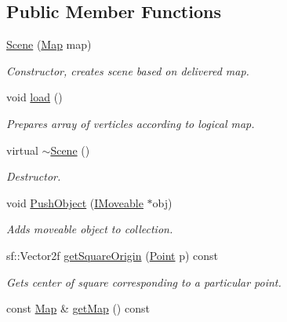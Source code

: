 \subsection*{Public Member Functions}
\begin{DoxyCompactItemize}
\item 
\mbox{\hyperlink{class_scene_a7a4f0004dce8380ca0e31f573a92d7f2}{Scene}} (\mbox{\hyperlink{class_map}{Map}} map)
\begin{DoxyCompactList}\small\item\em Constructor, creates scene based on delivered map. \end{DoxyCompactList}\item 
\mbox{\label{class_scene_ae1b864ad69216f68b5c588477c87ec20}} 
void \mbox{\hyperlink{class_scene_ae1b864ad69216f68b5c588477c87ec20}{load}} ()
\begin{DoxyCompactList}\small\item\em Prepares array of verticles according to logical map. \end{DoxyCompactList}\item 
\mbox{\label{class_scene_a3b8cec2e32546713915f8c6303c951f1}} 
virtual \mbox{\hyperlink{class_scene_a3b8cec2e32546713915f8c6303c951f1}{$\sim$\+Scene}} ()
\begin{DoxyCompactList}\small\item\em Destructor. \end{DoxyCompactList}\item 
void \mbox{\hyperlink{class_scene_a77d8f570a3b13a237b31888429288946}{Push\+Object}} (\mbox{\hyperlink{class_i_moveable}{I\+Moveable}} $\ast$obj)
\begin{DoxyCompactList}\small\item\em Adds moveable object to collection. \end{DoxyCompactList}\item 
sf\+::\+Vector2f \mbox{\hyperlink{class_scene_a527feb6bbb5f751494fac5a3503657e7}{get\+Square\+Origin}} (\mbox{\hyperlink{class_point}{Point}} p) const
\begin{DoxyCompactList}\small\item\em Gets center of square corresponding to a particular point. \end{DoxyCompactList}\item 
const \mbox{\hyperlink{class_map}{Map}} \& \mbox{\hyperlink{class_scene_a63e098d10e04e864474e4949690c6f57}{get\+Map}} () const

\end{DoxyCompactItemize}
